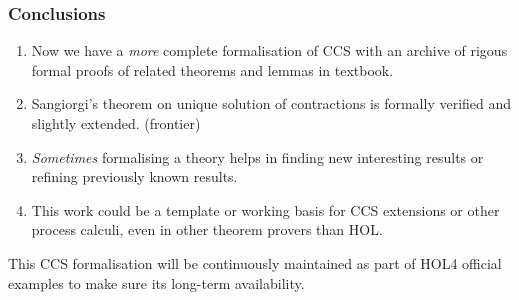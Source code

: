 \begin{frame}
\frametitle{Conclusions}
\begin{enumerate}
\item Now we have a \emph{more} complete formalisation of CCS with an
  archive of rigous formal proofs of related theorems and lemmas in textbook.
\item Sangiorgi's theorem on unique solution of contractions is formally verified and
  slightly extended. (frontier)
\item \emph{Sometimes} formalising a theory helps in finding
  new interesting results or refining previously known results.
\item This work could be a template or working basis for CCS extensions or other process calculi, even in other
  theorem provers than HOL.
\end{enumerate}

This CCS formalisation will be continuously maintained as part of HOL4
official examples to make sure its long-term availability.
\end{frame}



